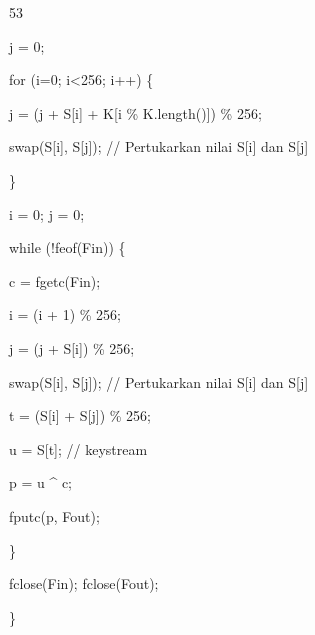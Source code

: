 \documentclass{article}
\begin{document}

53

j = 0;

 for (i=0; i<256; i++) \{

     j = (j + S[i] + K[i \% K.length()]) \% 256;

     swap(S[i], S[j]); // Pertukarkan nilai S[i] dan S[j] 

 \}

 i = 0;   j = 0;

while (!feof(Fin)) \{

     c = fgetc(Fin); 

     i = (i + 1) \% 256;

     j = (j + S[i]) \% 256;

     swap(S[i], S[j]);    // Pertukarkan nilai S[i] dan S[j] 

     t = (S[i] + S[j]) \% 256;

     u = S[t];   // keystream 

     p = u \textasciicircum{} c;       

     fputc(p, Fout);     

 \}  

 fclose(Fin);  fclose(Fout);

\}
\end{document}
